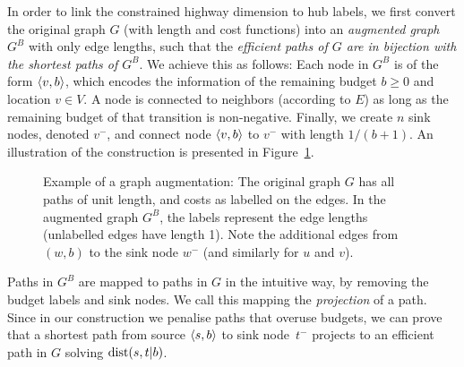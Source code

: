 In order to link the constrained highway dimension to hub labels, we first convert the original graph $G$ (with length and cost functions) into an \emph{augmented graph} $G^B$ with only edge lengths, such that the \emph{efficient paths of $G$ are in bijection with the shortest paths of $G^B$}.
We achieve this as follows: Each node in $G^B$ is of the form $\langle v,b\rangle$, which encodes the information of the remaining budget $b\geq 0$ and location $v\in V$.
A node is connected to neighbors (according to $E$) as long as the remaining budget of that transition is non-negative.
Finally, we create $n$ sink nodes, denoted $v^-$, and connect node $\langle v,b\rangle$ to $v^-$ with length $1/(b+1)$.
An illustration of the construction is presented in Figure~\ref{fig:augmented}.


\begin{figure}

\caption{Example of a graph augmentation: The original graph $G$ has all paths of unit length, and costs as labelled on the edges. In the augmented graph $G^B$, the labels represent the edge lengths (unlabelled edges have length 1). Note the additional edges from $(w,b)$ to the sink node $w^-$ (and similarly for $u$ and $v$). 
}
\label{fig:augmented}
\end{figure}

Paths in $G^B$ are mapped to paths in $G$ in the intuitive way, by removing the budget labels and sink nodes.
We call this mapping the \emph{projection} of a path.
Since in our construction we penalise paths that overuse budgets, we can prove that
a shortest path from source $\langle s,b\rangle$ to sink node~$t^-$ projects to an efficient path in $G$ solving $\mbox{dist}(s,t|b)$. 

